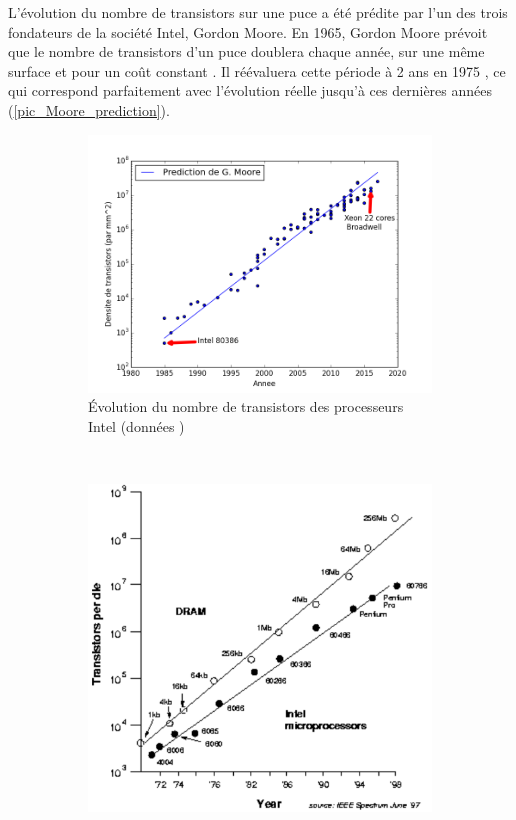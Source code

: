 L'évolution du nombre de transistors sur une puce a été prédite par l'un des trois fondateurs de la société Intel, Gordon Moore. En 1965, Gordon Moore prévoit que le nombre de transistors d'un puce doublera chaque année, sur une même surface et pour un coût constant \cite{Moore1998}. Il réévaluera cette période à 2 ans en 1975 \cite{Moore75}, ce qui correspond parfaitement avec l'évolution réelle jusqu'à ces dernières années (\autoref{pic_Moore_prediction}).




\begin{figure}
    \begin{subfigure}[]{0.48\linewidth}\centering
        \vspace{1cm}
        \includegraphics[width=\linewidth]{images/Chapitre1/Moore_prediction.png}
        \caption{\label{pic_Moore_prediction} Évolution du nombre de transistors des processeurs Intel (données \cite{Wikipedia2019Transistor})}
    \end{subfigure}
    ~ %
    \begin{subfigure}[]{0.48\linewidth}\centering
        \includegraphics[width=0.9\linewidth]{images/processeurs_porte_moore_dram.png}

\end{subfigure}
\end{figure}
